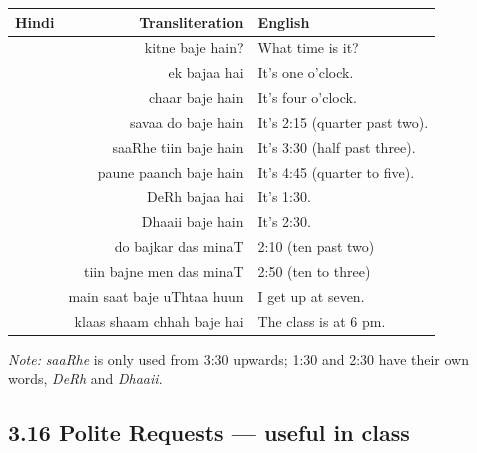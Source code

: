 \begin{tabular}{@{}HRG@{}}
  \toprule
  Hindi & Transliteration & English \\
  \midrule
            & kitne baje hain?        & What time is it? \\
                & ek bajaa hai            & It's one o'clock. \\
              & chaar baje hain         & It's four o'clock. \\
           & savaa do baje hain      & It's 2:15 (quarter past two). \\
         & saaRhe tiin baje hain   & It's 3:30 (half past three). \\
         & paune paanch baje hain  & It's 4:45 (quarter to five). \\
               & DeRh bajaa hai          & It's 1:30. \\
               & Dhaaii baje hain        & It's 2:30. \\
            & do bajkar das minaT     & 2:10 (ten past two) \\
        & tiin bajne men das minaT & 2:50 (ten to three) \\
      & main saat baje uThtaa huun & I get up at seven. \\
       & klaas shaam chhah baje hai & The class is at 6 pm. \\
  \bottomrule
\end{tabular}

\noindent\textit{Note:} \textit{saaRhe} is only used from 3:30 upwards; 1:30 and 2:30 have their own words, \textit{DeRh} and \textit{Dhaaii}.

\subsection{3.16 Polite Requests — useful in class}


